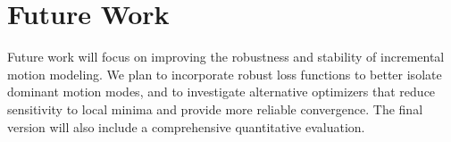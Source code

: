 \section{Future Work}
\label{sec:future-work}Future work will focus on improving the robustness and stability of incremental motion modeling. We plan to incorporate robust loss functions to better isolate dominant motion modes, and to investigate alternative optimizers that reduce sensitivity to local minima and provide more reliable convergence. The final version will also include a comprehensive quantitative evaluation.

